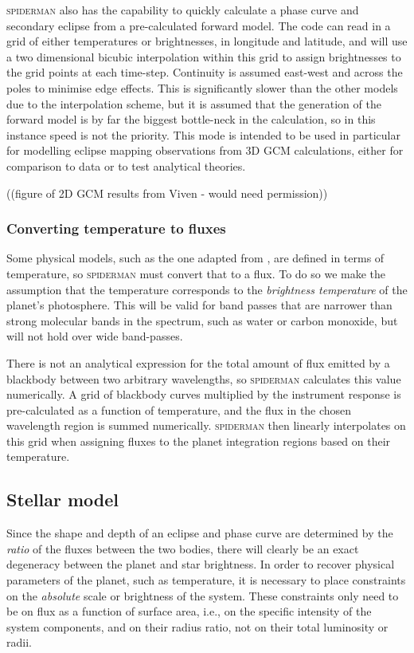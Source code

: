 \documentclass[a4paper,fleqn,usenatbib]{mnras}
\begin{document}
\textsc{spiderman} also has the capability to quickly calculate a phase curve and secondary eclipse from a pre-calculated forward model. The code can read in a grid of either temperatures or brightnesses, in longitude and latitude, and will use a two dimensional bicubic interpolation within this grid to assign brightnesses to the grid points at each time-step. Continuity is assumed east-west and across the poles to minimise edge effects.
This is significantly slower than the other models due to the interpolation scheme, but it is assumed that the generation of the forward model is by far the biggest bottle-neck in the calculation, so in this instance speed is not the priority.
This mode is intended to be used in particular for modelling eclipse mapping observations from 3D GCM calculations, either for comparison to data or to test analytical theories.


((figure of 2D GCM results from Viven - would need permission))

\subsubsection{Converting temperature to fluxes}\label{sec:ttof}

Some physical models, such as the one adapted from \citep{Zhang2016}, are defined in terms of temperature, so \textsc{spiderman} must convert that to a flux. To do so we make the assumption that the temperature corresponds to the \emph{brightness temperature} of the planet's photosphere. This will be valid for band passes that are narrower than strong molecular bands in the spectrum, such as water or carbon monoxide, but will not hold over wide band-passes.

There is not an analytical expression for the total amount of flux emitted by a blackbody between two arbitrary wavelengths, so \textsc{spiderman} calculates this value numerically. A grid of blackbody curves multiplied by the instrument response is pre-calculated as a function of temperature, and the flux in the chosen wavelength region is summed numerically. \textsc{spiderman} then linearly interpolates on this grid when assigning fluxes to the planet integration regions based on their temperature.

\subsection{Stellar model}\label{sec:stellar model}

Since the shape and depth of an eclipse and phase curve are determined by the \emph{ratio} of the fluxes between the two bodies, there will clearly be an exact degeneracy between the planet and star brightness. In order to recover physical parameters of the planet, such as temperature, it is necessary to place constraints on the \emph{absolute} scale or brightness of the system. These constraints only need to be on flux as a function of surface area, i.e., on the specific intensity of the system components, and on their radius ratio, not on their total luminosity or radii.
\end{document}
